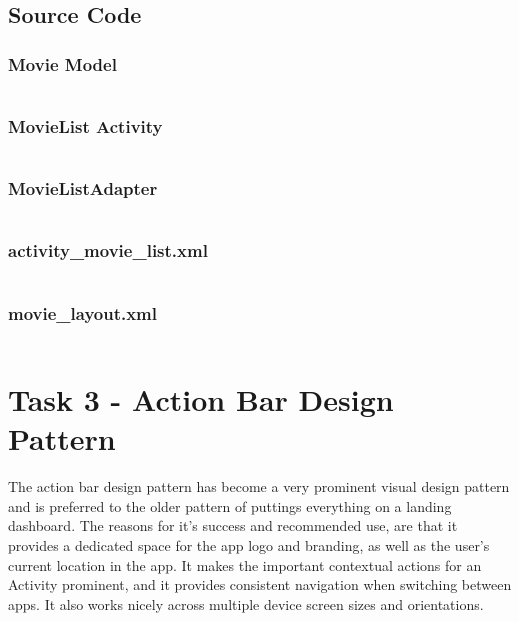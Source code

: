\documentclass[11pt,english,numbers=endperiod,parskip=half]{scrartcl}
\begin{document}
\begin{landscape}
\subsection{Source Code}
\subsubsection{Movie Model}
\inputminted{java}{../../Apps/Movies/app/src/main/java/au/net/danielparker/movies/Movie.java}

\subsubsection{MovieList Activity}
\inputminted{java}{../../Apps/Movies/app/src/main/java/au/net/danielparker/movies/MovieList.java}

\subsubsection{MovieListAdapter}
\inputminted{java}{../../Apps/Movies/app/src/main/java/au/net/danielparker/movies/MovieListAdapter.java}

\subsubsection{activity\_movie\_list.xml}
\inputminted{xml}{../../Apps/Movies/app/src/main/res/layout/activity_movie_list.xml}

\subsubsection{movie\_layout.xml}
\inputminted{xml}{../../Apps/Movies/app/src/main/res/layout/activity_movie_list.xml}

\end{landscape}


\section{Task 3 - Action Bar Design Pattern}
The action bar design pattern has become a very prominent visual design pattern
and is preferred to the older pattern of puttings everything on a landing dashboard.
The reasons for it's success and recommended use, are that it provides a dedicated
space for the app logo and branding, as well as the user's current location in
the app. It makes the important contextual actions for an Activity prominent,
and it provides consistent navigation when switching between apps. It also works
nicely across multiple device screen sizes and orientations.
\end{document}
